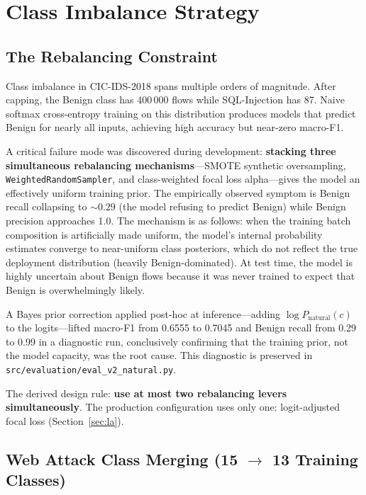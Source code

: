 \documentclass[12pt]{article}
\theoremstyle{plain}
\begin{document}
\newpage

\section{Class Imbalance Strategy}
\label{sec:imbalance}

\subsection{The Rebalancing Constraint}

Class imbalance in CIC-IDS-2018 spans multiple orders of magnitude. After capping, the Benign class has 400\,000 flows while SQL-Injection has 87. Naive softmax cross-entropy training on this distribution produces models that predict Benign for nearly all inputs, achieving high accuracy but near-zero macro-F1.

A critical failure mode was discovered during development: \textbf{stacking three simultaneous rebalancing mechanisms}—SMOTE synthetic oversampling, \texttt{WeightedRandomSampler}, and class-weighted focal loss alpha—gives the model an effectively uniform training prior. The empirically observed symptom is Benign recall collapsing to $\sim 0.29$ (the model refusing to predict Benign) while Benign precision approaches 1.0. The mechanism is as follows: when the training batch composition is artificially made uniform, the model's internal probability estimates converge to near-uniform class posteriors, which do not reflect the true deployment distribution (heavily Benign-dominated). At test time, the model is highly uncertain about Benign flows because it was never trained to expect that Benign is overwhelmingly likely.

A Bayes prior correction applied post-hoc at inference—adding $\log P_{\text{natural}}(c)$ to the logits—lifted macro-F1 from 0.6555 to 0.7045 and Benign recall from 0.29 to 0.99 in a diagnostic run, conclusively confirming that the training prior, not the model capacity, was the root cause. This diagnostic is preserved in \texttt{src/evaluation/eval\_v2\_natural.py}.

The derived design rule: \textbf{use at most two rebalancing levers simultaneously}. The production configuration uses only one: logit-adjusted focal loss (Section~\ref{sec:la}).

\subsection{Web Attack Class Merging (15 $\to$ 13 Training Classes)}
\end{document}
